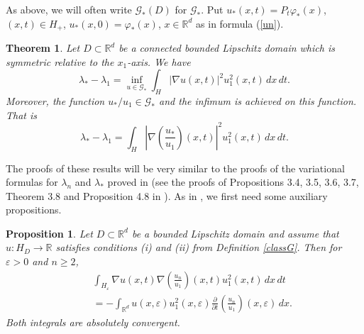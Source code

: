 \documentclass[11pt,leqno]{article}
\newtheorem{thm}{Theorem}[section]
\newtheorem{prop}{Proposition}[section]
\theoremstyle{definition}
\newcommand{\Rd}{\mathbb{R}^d}
\newcommand{\R}{\mathbb{R}}
\newcommand{\eps}{\varepsilon}
\numberwithin{equation}{section}
\begin{document}
As above,  we will often write  $\mathcal{G}_*(D)$ for 
$\mathcal{G}_*$. Put $u_*(x,t) = P_t \varphi_*(x)$, 
$(x,t) \in H_+$, $u_*(x,0) = \varphi_*(x)$, $x \in \Rd$
as in formula (\ref{un}).

\begin{thm}
\label{variationalf*}
Let $D \subset \Rd$ be a connected bounded Lipschitz domain
 which is symmetric relative to the $x_1$-axis. We have
$$
\lambda_{*} - \lambda_{1} = \inf_{u \in \mathcal{G}_*} \int_{H} |\nabla 
u(x,t)|^{2} u_1^2(x,t) \, dx \, dt.
$$
Moreover,  the function $u_*/u_1 \in \mathcal{G}_*$ and the 
infimum is achieved on this function.  That is 
$$
\lambda_{*} - \lambda_{1} =  \int_{H} 
\left|\nabla\left(\frac{u_*}{u_1}\right)(x,t)\right|^{2} u_1^2(x,t) \, dx \, dt.
$$
\end{thm}

The proofs of these results 
 will be very similar to the proofs of the variational
formulas for $\lambda_n$ and $\lambda_*$ proved in \cite{BK} 
(see the proofs of Propositions 3.4, 3.5, 3.6, 3.7,
Theorem 3.8 and Proposition 4.8 in \cite{BK}). As in \cite{BK}, 
we first need  some auxiliary propositions.

\begin{prop}
\label{Heps}
Let $D \subset \Rd$ be a bounded Lipschitz domain and assume 
that $u: H_D \to \R$ satisfies conditions (i) and (ii) from Definition \ref{classG}.
 Then for $\eps > 0$ and $n \ge 2$,  
\begin{eqnarray}
&&
\nonumber
\int_{H_{\eps}} \nabla u(x,t) \nabla \left(\frac{u_n}{u_1}\right)(x,t) u_1^2(x,t) \, dx \, dt \\
&&
\label{firstf}
= - \int_{\Rd} u(x,\eps) u_1^2(x,\eps) \frac{\partial}{\partial t} \left(\frac{u_n}{u_1}\right)(x,\eps) \, dx.
\end{eqnarray}
Both integrals are absolutely convergent.
\end{prop}
\end{document}
